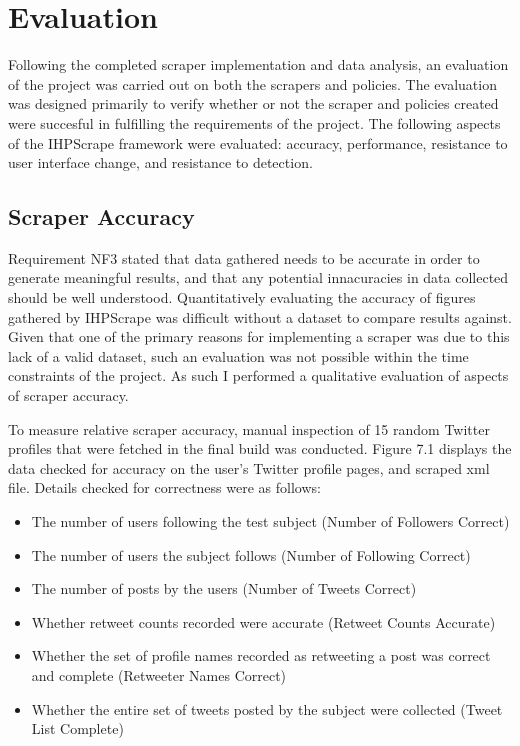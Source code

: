 \chapter{Evaluation}\label{C:us}

Following the completed scraper implementation and data analysis, an evaluation of the project was carried out on both the scrapers and policies. The evaluation was designed primarily to verify whether or not the scraper and policies created were succesful in fulfilling the requirements of the project. The following aspects of the IHPScrape framework were evaluated: accuracy, performance, resistance to user interface change, and  resistance to detection. 

\section{Scraper Accuracy}

Requirement NF3 stated that data gathered needs to be accurate in order to generate meaningful results, and that any potential innacuracies in data collected should be well understood. Quantitatively evaluating the accuracy of figures gathered by IHPScrape was difficult without a dataset to compare results against. Given that one of the primary reasons for implementing a scraper was due to this lack of a valid dataset, such an evaluation was not possible within the time constraints of the project.  As such I performed a qualitative evaluation of aspects of scraper accuracy. 

To measure relative scraper accuracy, manual inspection of 15 random Twitter profiles that were fetched in the final build was conducted. Figure 7.1 displays the data checked for accuracy on the user's Twitter profile pages, and scraped xml file. Details checked for correctness were as follows:

\begin{itemize}
 \item The number of users following the test subject (Number of Followers Correct)
 \item The number of users the subject follows (Number of Following Correct)
 \item The number of posts by the users (Number of Tweets Correct)
 \item Whether retweet counts recorded were accurate (Retweet Counts Accurate)
 \item Whether the set of profile names recorded as retweeting a post was correct and complete (Retweeter Names Correct)
 \item Whether the entire set of tweets posted by the subject were collected (Tweet List Complete)
\end{itemize}

